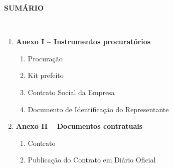 \documentclass[
]{article}
\author{}
\date{}
\begin{document}
\textbf{SUMÁRIO}\\
\strut \\
\begin{enumerate}
  \item \textbf{Anexo I -- Instrumentos procuratórios }
  \begin{enumerate}
    \item Procuração 
    \item Kit prefeito 
    \item Contrato Social da Empresa 
    \item Documento de Identificação do Representante 
  \end{enumerate}
  \item \textbf{Anexo II -- Documentos contratuais }
  \begin{enumerate}
    \item Contrato 
    \item Publicação do Contrato em Diário Oficial 
    
  \end{enumerate}
\end{enumerate}
\end{document}
